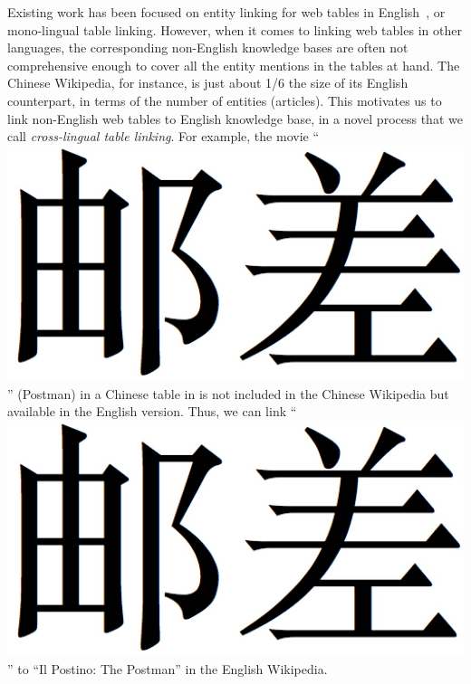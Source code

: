 Existing work has been focused on entity linking for web tables 
in English~\cite{bhagavatula2015tabel,limaye2010annotating}, or mono-lingual table linking.
However, when it comes to linking web tables in other languages, the corresponding
non-English knowledge bases are often not comprehensive enough to cover all the entity mentions 
in the tables at hand.  The Chinese Wikipedia, for instance, is just about 1/6 the size of
its English counterpart, in terms of the number of entities (articles). This motivates us to
link non-English web tables to English knowledge base, in a novel process 
that we call {\em cross-lingual table linking}.
For example, the movie ``
\includegraphics[height=1.3\fontcharht\font`\B]{figures/youchai.png} 
'' (Postman) in a Chinese table in 
 is not included in the Chinese Wikipedia but available in 
the English version. Thus, we can link  ``
\includegraphics[height=1.3\fontcharht\font`\B]{figures/youchai.png} 
'' to ``Il Postino: The Postman'' in the English Wikipedia.

